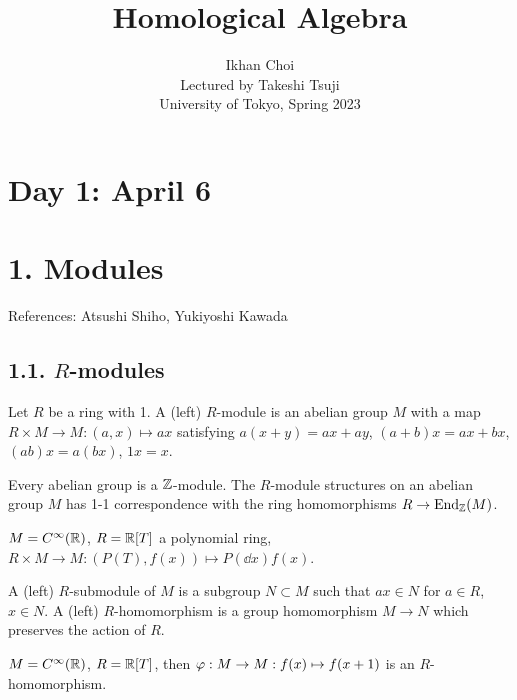 \documentclass{../../small}
\begin{document}
\title{Homological Algebra}
\author{Ikhan Choi\\Lectured by Takeshi Tsuji\\University of Tokyo, Spring 2023}
\maketitle
\tableofcontents

\newpage
\section{Day 1: April 6}

\section*{1. Modules}

References: Atsushi Shiho, Yukiyoshi Kawada

\subsection*{1.1. $R$-modules}
\begin{defn}
Let $R$ be a ring with 1.
A (left) $R$-module is an abelian group $M$ with a map $R\times M\to M:(a,x)\mapsto ax$ satisfying $a(x+y)=ax+ay$, $(a+b)x=ax+bx$, $(ab)x=a(bx)$, $1x=x$.
\end{defn}
\begin{ex}
\begin{parts}
\item Every abelian group is a $\mathbb{Z}$-module. The $R$-module structures on an abelian group $M$ has 1-1 correspondence with the ring homomorphisms $R\to\operatorname{End}_{\mathbb{Z}}(M)$.
\item $M=C^\infty(\mathbb{R})$, $R=\mathbb{R}[T]$ a polynomial ring, $R\times M\to M:(P(T),f(x))\mapsto P(\dd{x})f(x)$.
\end{parts}
\end{ex}

\begin{defn}
A (left) $R$-submodule of $M$ is a subgroup $N\subset M$ such that $ax\in N$ for $a\in R$, $x\in N$.
A (left) $R$-homomorphism is a group homomorphism $M\to N$ which preserves the action of $R$.
\end{defn}
\begin{ex}
\begin{parts}
\item $M=C^\infty(\mathbb{R})$, $R=\mathbb{R}[T]$, then $\varphi:M\to M:f(x)\mapsto f(x+1)$ is an $R$-homomorphism.
\end{parts}
\end{ex}
\end{document}
